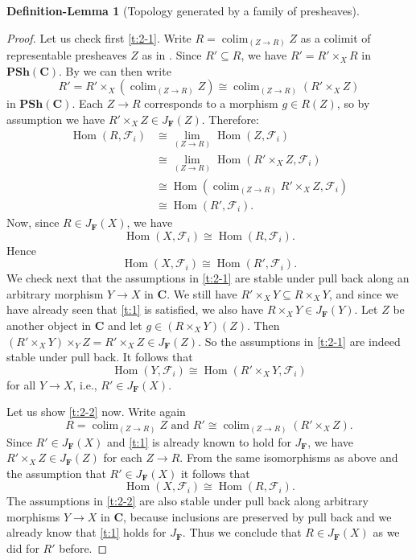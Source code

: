 \documentclass[12pt,reqno,a4paper]{amsart}
\theoremstyle{plain}
\theoremstyle{definition}
\newtheorem{defnlm}[thm]{Definition-Lemma}
\theoremstyle{remark}
\begin{document}
\begin{defnlm}[Topology generated by a family of presheaves]
\begin{proof}
    Let us check first \ref{t:2-1}.
    Write $R = \operatorname{colim}_{(Z \to R)} Z$ as a colimit of representable presheaves $Z$ as in \cite[Exposé I, Proposition 3.4]{sga4}.
    Since $R' \subseteq R$, we have $R' = R' \times_{X} R$ in $\mathbf{PSh}(\mathbf{C})$.
    By \cite[Exposé I, Corollaire 3.3]{sga4} we can then write
    \[ R' = R' \times_{X} (\operatorname{colim}_{(Z \to R)}Z) \cong \operatorname{colim}_{(Z \to R)} (R' \times_{X} Z) \]
    in $\mathbf{PSh}(\mathbf{C})$.
    Each $Z \to R$ corresponds to a morphism $g \in R(Z)$, so by assumption we have $R' \times_{X} Z \in J_{\mathbf{F}}(Z)$.
    Therefore:
    \begin{align*}
      \operatorname{Hom}(R,\mathscr{F}_{i}) & \cong \operatorname{lim}_{(Z \to R)} \operatorname{Hom}(Z,\mathscr{F}_{i}) \\
      & \cong \operatorname{lim}_{(Z \to R)} \operatorname{Hom}(R' \times_{X} Z, \mathscr{F}_{i}) \\
      & \cong \operatorname{Hom}(\operatorname{colim}_{(Z \to R)} R' \times_{X} Z, \mathscr{F}_{i}) \\
      & \cong \operatorname{Hom}(R',\mathscr{F}_{i}).
    \end{align*}
    Now, since $R \in J_{\mathbf{F}}(X)$, we have
    \[ \operatorname{Hom}(X,\mathscr{F}_{i}) \cong \operatorname{Hom}(R,\mathscr{F}_{i}). \]
    Hence
    \[ \operatorname{Hom}(X,\mathscr{F}_{i}) \cong \operatorname{Hom}(R', \mathscr{F}_{i}). \]
    We check next that the assumptions in \ref{t:2-1} are stable under pull back along an arbitrary morphism $Y \to X$ in $\mathbf{C}$.
    We still have $R' \times_{X} Y \subseteq R \times_{X} Y$, and since we have already seen that \ref{t:1} is satisfied, we also have $R \times_{X} Y \in J_{\mathbf{F}}(Y)$.
    Let $Z$ be another object in $\mathbf{C}$ and let $g \in (R \times_{X} Y)(Z)$.
    Then $(R' \times_{X} Y) \times_{Y} Z = R' \times_{X} Z \in J_{\mathbf{F}}(Z)$.
    So the assumptions in \ref{t:2-1} are indeed stable under pull back.
    It follows that
    \[ \operatorname{Hom}(Y,\mathscr{F}_{i}) \cong \operatorname{Hom}(R' \times_{X} Y,\mathscr{F}_{i}) \]
    for all $Y \to X$, i.e., $R' \in J_{\mathbf{F}}(X)$.

    Let us show \ref{t:2-2} now.
    Write again
    \[ R = \operatorname{colim}_{(Z \to R)} Z \text{ and } R' \cong \operatorname{colim}_{(Z \to R)} (R' \times_{X} Z). \]
    Since $R' \in J_{\mathbf{F}}(X)$ and \ref{t:1} is already known to hold for $J_{\mathbf{F}}$, we have $R' \times_{X} Z \in J_{\mathbf{F}}(Z)$ for each $Z \to R$.
    From the same isomorphisms as above and the assumption that $R' \in J_{\mathbf{F}}(X)$ it follows that
    \[ \operatorname{Hom}(X,\mathscr{F}_{i}) \cong \operatorname{Hom}(R,\mathscr{F}_{i}). \]
    The assumptions in \ref{t:2-2} are also stable under pull back along arbitrary morphisms $Y \to X$ in $\mathbf{C}$, because inclusions are preserved by pull back and we already know that \ref{t:1} holds for $J_{\mathbf{F}}$.
    Thus we conclude that $R \in J_{\mathbf{F}}(X)$ as we did for $R'$ before.
  \end{proof}
\end{defnlm}
\end{document}

